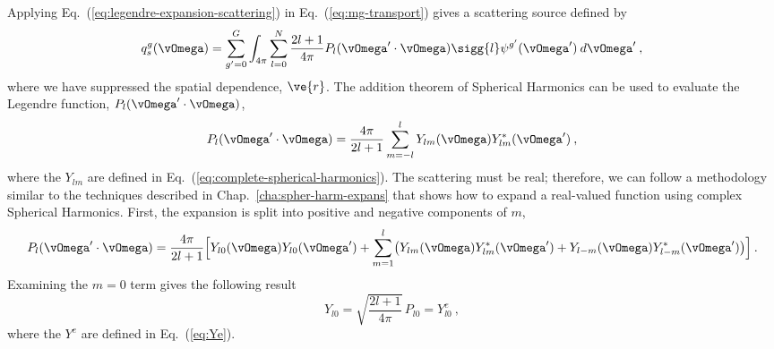\documentclass{article}
\numberwithin{equation}{subsection}
\begin{document}
Applying Eq.~(\ref{eq:legendre-expansion-scattering}) in
Eq.~(\ref{eq:mg-transport}) gives a scattering source defined by
\begin{equation}
  q^g_{s}(\vOmega) = \sum_{g'=0}^G \int_{4\pi}
  \sum_{l=0}^N\frac{2l+1}{4\pi}P_{l}(\vOmega'\cdot\vOmega)\sigg{l}
  \psi^{g'}(\vOmega')\:d\vOmega'\:,
  \label{eq:scattering-source-before-addition}
\end{equation}
where we have suppressed the spatial dependence, $\ve{r}$.  The
addition theorem of Spherical Harmonics can be used to evaluate the
Legendre function, $P_l(\vOmega'\cdot\vOmega)$,
\begin{equation}
  P_l(\vOmega'\cdot\vOmega) = \frac{4\pi}{2l+1}\sum_{m=-l}^l
  Y_{lm}(\vOmega)Y^{\ast}_{lm}(\vOmega')\:,
\end{equation}
where the $Y_{lm}$ are defined in Eq.~(\ref{eq:complete-spherical-harmonics}).
The scattering must be real; therefore, we can follow a methodology similar to
the techniques described in Chap.~\ref{cha:spher-harm-expans} that shows how
to expand a real-valued function using complex Spherical Harmonics.  First,
the expansion is split into positive and negative components of $m$,
\begin{equation}
  P_l(\vOmega'\cdot\vOmega) = \frac{4\pi}{2l+1}
  \Bigl[
  Y_{l0}(\vOmega)Y_{l0}(\vOmega') +
  \sum_{m=1}^l
  \bigl(Y_{lm}(\vOmega)Y^{\ast}_{lm}(\vOmega') +
  Y_{l-m}(\vOmega)Y^{\ast}_{l-m}(\vOmega')\bigr)\Bigr]\:.
\end{equation}
Examining the $m=0$ term gives the following result
\begin{equation}
  Y_{l0} = \sqrt{\frac{2l+1}{4\pi}}\,P_{l0} = Y^e_{l0}\:,
\end{equation}
where the $Y^e$ are defined in Eq.~(\ref{eq:Ye}).
\end{document}
